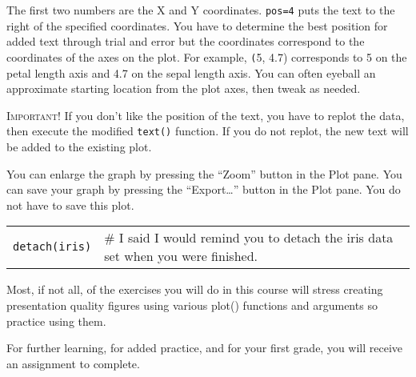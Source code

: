 \documentclass[11pt]{article}
\begin{document}
The first two numbers are the X and Y coordinates. \texttt{pos=4} puts the text to the right of the specified coordinates. You have to determine the best position for added text through trial and error but the coordinates correspond to the coordinates of the axes on the plot. For example, \texttt(5, 4.7) corresponds to 5 on the petal length axis and 4.7 on the sepal length axis. You can often eyeball an approximate starting location from the plot axes, then tweak as needed.

\textsc{Important!} If you don't like the position of the text, you have to replot the data, then execute the modified \texttt{text()} function. If you do not replot, the new text will be added to the existing plot.

You can enlarge the graph by pressing the “Zoom” button in the Plot pane. You can save your graph by pressing the “Export\dots” button in the Plot pane. You do not have to save this plot.


\begin{tabular}{@{}L{1in}L{4.5in}@{}}
\texttt{detach(iris)} & \# I said I would remind you to detach the iris data set
when you were finished. \\
\end{tabular}


Most, if not all, of the exercises you will do in this course will
stress creating presentation quality figures using various plot()
functions and arguments so practice using them.

For further learning, for added practice, and for your first grade, you
will receive an assignment to complete.
\end{document}
